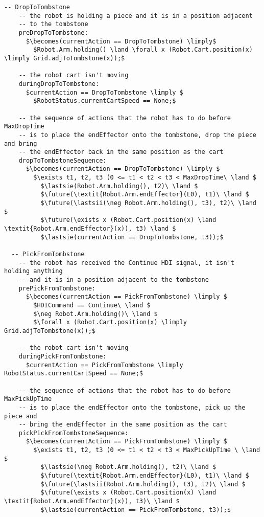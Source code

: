 \begin{lstlisting}[fontadjust, mathescape, frame=single]
  -- DropToTombstone
    -- the robot is holding a piece and it is in a position adjacent 
    -- to the tombstone
    preDropToTombstone:
      $\becomes(currentAction == DropToTombstone) \limply$
        $Robot.Arm.holding() \land \forall x (Robot.Cart.position(x) \limply Grid.adjToTombstone(x));$

    -- the robot cart isn't moving
    duringDropToTombstone:
      $currentAction == DropToTombstone \limply $
        $RobotStatus.currentCartSpeed == None;$

    -- the sequence of actions that the robot has to do before MaxDropTime 
    -- is to place the endEffector onto the tombstone, drop the piece and bring 
    -- the endEffector back in the same position as the cart
    dropToTombstoneSequence:
      $\becomes(currentAction == DropToTombstone) \limply $
        $\exists t1, t2, t3 (0 <= t1 < t2 < t3 < MaxDropTime\ \land $
          $\lastsie(Robot.Arm.holding(), t2)\ \land $
          $\future(\textit{Robot.Arm.endEffector}(L0), t1)\ \land $
          $\future(\lastsii(\neg Robot.Arm.holding(), t3), t2)\ \land $
          $\future(\exists x (Robot.Cart.position(x) \land \textit{Robot.Arm.endEffector}(x)), t3) \land $
          $\lastsie(currentAction == DropToTombstone, t3));$

  -- PickFromTombstone
    -- the robot has received the Continue HDI signal, it isn't holding anything 
    -- and it is in a position adjacent to the tombstone
    prePickFromTombstone:
      $\becomes(currentAction == PickFromTombstone) \limply $
        $HDICommand == Continue\ \land $
        $\neg Robot.Arm.holding()\ \land $
        $\forall x (Robot.Cart.position(x) \limply Grid.adjToTombstone(x));$

    -- the robot cart isn't moving
    duringPickFromTombstone:
      $currentAction == PickFromTombstone \limply RobotStatus.currentCartSpeed == None;$

    -- the sequence of actions that the robot has to do before MaxPickUpTime 
    -- is to place the endEffector onto the tombstone, pick up the piece and 
    -- bring the endEffector in the same position as the cart
    pickPickFromTombstoneSequence:
      $\becomes(currentAction == PickFromTombstone) \limply $
        $\exists t1, t2, t3 (0 <= t1 < t2 < t3 < MaxPickUpTime \ \land $
          $\lastsie(\neg Robot.Arm.holding(), t2)\ \land $
          $\future(\textit{Robot.Arm.endEffector}(L0), t1)\ \land $
          $\future(\lastsii(Robot.Arm.holding(), t3), t2)\ \land $
          $\future(\exists x (Robot.Cart.position(x) \land \textit{Robot.Arm.endEffector}(x)), t3)\ \land $
          $\lastsie(currentAction == PickFromTombstone, t3));$
    

\end{lstlisting}
